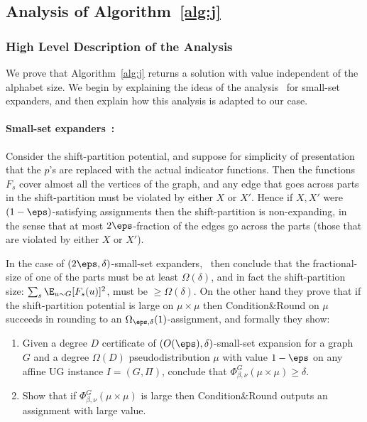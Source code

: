 \subsection{Analysis of Algorithm~\ref{alg:j}}
\subsubsection{High Level Description of the Analysis}
We prove that Algorithm~\ref{alg:j} returns a solution with value independent of the alphabet size. We begin by explaining the ideas of the analysis~\cite{BBKSS} for small-set expanders, and then 
explain how this analysis is adapted to our case.

\paragraph{Small-set expanders~\cite{BBKSS}:} 
Consider the shift-partition potential, 
and suppose for simplicity of presentation that the $p$'s are replaced with the actual indicator functions. 
Then the functions $F_s$ cover 
almost all the vertices of the graph, 
and any edge that goes across parts in the shift-partition must be violated by either $X$ or $X'$. Hence if $X,X'$ were $(1-\eps)$-satisfying assignments then the shift-partition is non-expanding, in the sense that at most $2\eps$-fraction of the edges go across the parts (those that are violated 
by either $X$ or $X'$). 

In the case of $(2\eps,\delta)$-small-set expanders,~\cite{BBKSS} then conclude that the fractional-size of one of the parts must be at least $\Omega(\delta)$, and in fact the shift-partition size: $\sum_s \E_{u \sim G}[F_s(u)]^2$, must be $\geq \Omega(\delta)$. On the other hand they prove that if the shift-partition potential is large on $\mu \times \mu$ then Condition\&Round on $\mu$ succeeds in rounding to an $\Omega_{\eps,\delta}(1)$-assignment, 
and formally they show:
\begin{enumerate}
\item Given a degree $D$ certificate of $(O(\eps),\delta)$-small-set expansion for a graph $G$ and a degree $\Omega(D)$ pseudodistribution $\mu$ with value $1-\eps$ on any affine UG instance $I = (G,\Pi)$, conclude that $\Phi^G_{\beta,\nu}(\mu \times \mu) \geq \delta$.
\item Show that if $\Phi^G_{\beta,\nu}(\mu \times \mu)$ is large then Condition\&Round outputs an assignment with large value.
\end{enumerate}

